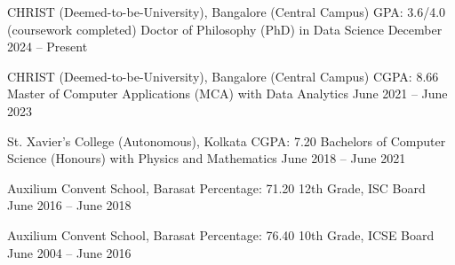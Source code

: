 \documentclass[../main.tex]{subfiles}
\begin{document}
\resumeSubHeadingListStart

    \resumeEduHeading
        {CHRIST (Deemed-to-be-University), Bangalore (Central Campus)}
        {GPA: 3.6/4.0 (coursework completed)}
        {Doctor of Philosophy (PhD) in Data Science}
        {December 2024 -- Present}
    \vspace{0.2em}

    \resumeEduHeading
        {CHRIST (Deemed-to-be-University), Bangalore (Central Campus)}
        {CGPA: 8.66}
        {Master of Computer Applications (MCA) with Data Analytics}
        {June 2021 -- June 2023}
    \vspace{0.2em}

    \resumeEduHeading
        {St. Xavier's College (Autonomous), Kolkata}
        {CGPA: 7.20}
        {Bachelors of Computer Science (Honours) with Physics and Mathematics}
        {June 2018 -- June 2021}
    \vspace{0.2em}

    \resumeEduHeading
        {Auxilium Convent School, Barasat}
        {Percentage: 71.20}
        {12th Grade, ISC Board}
        {June 2016 -- June 2018} 
    \vspace{0.2em}

    \resumeEduHeading
        {Auxilium Convent School, Barasat}
        {Percentage: 76.40}
        {10th Grade, ICSE Board}
        {June 2004 -- June 2016}

\resumeSubHeadingListEnd
\end{document}
